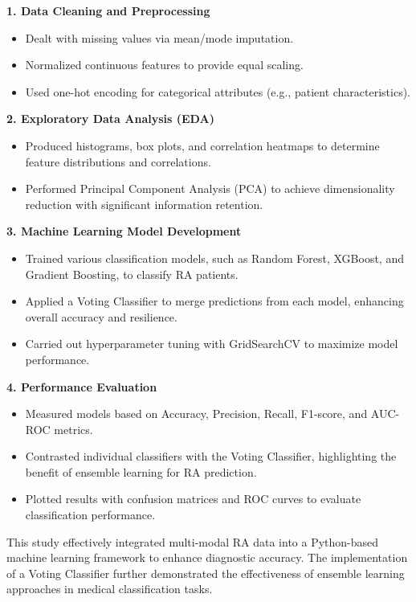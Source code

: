 \documentclass[10pt]{NSP1}
\begin{document}
	\textbf{1. Data Cleaning and Preprocessing}
	\begin{itemize}
		\item Dealt with missing values via mean/mode imputation.
		\item Normalized continuous features to provide equal scaling.
		\item Used one-hot encoding for categorical attributes (e.g., patient characteristics).
	\end{itemize}
	\textbf{2. Exploratory Data Analysis (EDA)}
	\begin{itemize}
		\item Produced histograms, box plots, and correlation heatmaps to determine feature distributions and correlations.
		\item Performed Principal Component Analysis (PCA) to achieve dimensionality reduction with significant information retention.
	\end{itemize}
	\textbf{3. Machine Learning Model Development}
	\begin{itemize}
		\item Trained various classification models, such as Random Forest, XGBoost, and Gradient Boosting, to classify RA patients.
		\item Applied a Voting Classifier to merge predictions from each model, enhancing overall accuracy and resilience.
		\item Carried out hyperparameter tuning with GridSearchCV to maximize model performance.
	\end{itemize}
	\textbf{4. Performance Evaluation}
	\begin{itemize}
		\item Measured models based on Accuracy, Precision, Recall, F1-score, and AUC-ROC metrics.
		\item Contrasted individual classifiers with the Voting Classifier, highlighting the benefit of ensemble learning for RA prediction.
		\item Plotted results with confusion matrices and ROC curves to evaluate classification performance.
	\end{itemize}
	
	\noindent This study effectively integrated multi-modal RA data into a Python-based machine learning framework to enhance diagnostic accuracy. The implementation of a Voting Classifier further demonstrated the effectiveness of ensemble learning approaches in medical classification tasks.
	
\end{document}
